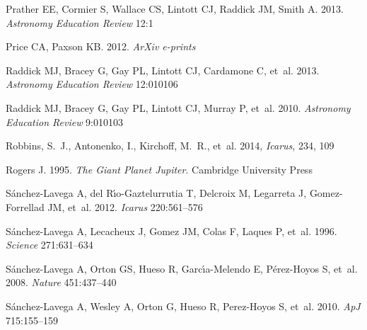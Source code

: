 \documentclass{ar2e}
\begin{document}
\begin{thebibliography}{}
{Prather} EE, {Cormier} S, {Wallace} CS, {Lintott} CJ, {Raddick} JM, {Smith} A.
  2013.
\newblock \textit{{Astronomy Education Review}} 12:1

{Price} CA, {Paxson} KB. 2012.
\newblock \textit{ArXiv e-prints}

{Raddick} MJ, {Bracey} G, {Gay} PL, {Lintott} CJ, {Cardamone} C, et~al. 2013.
\newblock \textit{Astronomy Education Review} 12:010106

{Raddick} MJ, {Bracey} G, {Gay} PL, {Lintott} CJ, {Murray} P, et~al. 2010.
\newblock \textit{Astronomy Education Review} 9:010103

{Robbins}, S.~J., {Antonenko}, I., {Kirchoff}, M.~R., {et~al.} 2014, 
\newblock \textit{Icarus}, 234, 109

Rogers J. 1995.
\newblock \textit{{The Giant Planet Jupiter}}.
\newblock Cambridge University Press

{S{\'a}nchez-Lavega} A, {del R{\'{\i}}o-Gaztelurrutia} T, {Delcroix} M,
  {Legarreta} J, {Gomez-Forrellad} JM, et~al. 2012.
\newblock \textit{Icarus} 220:561--576

{S{\'a}nchez-Lavega} A, {Lecacheux} J, {Gomez} JM, {Colas} F, {Laques} P,
  et~al. 1996.
\newblock \textit{Science} 271:631--634

{S{\'a}nchez-Lavega} A, {Orton} GS, {Hueso} R, {Garc{\'{\i}}a-Melendo} E,
  {P{\'e}rez-Hoyos} S, et~al. 2008.
\newblock \textit{Nature} 451:437--440

S{\'a}nchez-Lavega A, Wesley A, Orton G, Hueso R, Perez-Hoyos S, et~al. 2010.
\newblock \textit{ApJ} 715:155--159


\end{thebibliography}
\end{document}
